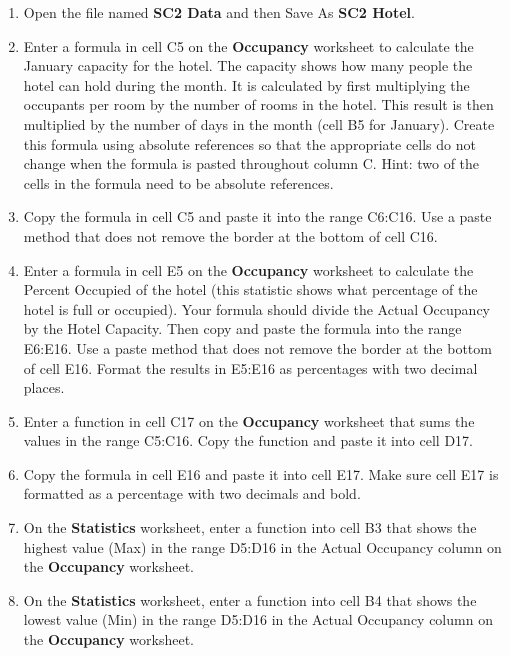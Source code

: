 \begin{enumerate}
	\item Open the file named \textbf{SC2 Data} and then Save As \textbf{SC2 Hotel}.
	
	\item Enter a formula in cell \textsf{C5} on the \textbf{Occupancy} worksheet to calculate the January capacity for the hotel. The capacity shows how many people the hotel can hold during the month. It is calculated by first multiplying the occupants per room by the number of rooms in the hotel. This result is then multiplied by the number of days in the month (cell \textsf{B5} for January). Create this formula using absolute references so that the appropriate cells do not change when the formula is pasted throughout column C. Hint: two of the cells in the formula need to be absolute references.
	
	\item Copy the formula in cell \textsf{C5} and paste it into the range \textsf{C6:C16}. Use a paste method that does not remove the border at the bottom of cell \textsf{C16}.
	
	\item Enter a formula in cell \textsf{E5} on the \textbf{Occupancy} worksheet to calculate the Percent Occupied of the hotel (this statistic shows what percentage of the hotel is full or occupied). Your formula should divide the Actual Occupancy by the Hotel Capacity. Then copy and paste the formula into the range \textsf{E6:E16}. Use a paste method that does not remove the border at the bottom of cell \textsf{E16}. Format the results in \textsf{E5:E16} as percentages with two decimal places.
	
	\item Enter a function in cell \textsf{C17} on the \textbf{Occupancy} worksheet that sums the values in the range \textsf{C5:C16}. Copy the function and paste it into cell \textsf{D17}.
	
	\item Copy the formula in cell \textsf{E16} and paste it into cell \textsf{E17}. Make sure cell \textsf{E17} is formatted as a percentage with two decimals and bold.
	
	\item On the \textbf{Statistics} worksheet, enter a function into cell \textsf{B3} that shows the highest value (Max) in the range \textsf{D5:D16} in the Actual Occupancy column on the \textbf{Occupancy} worksheet.
	
	\item On the \textbf{Statistics} worksheet, enter a function into cell \textsf{B4} that shows the lowest value (Min) in the range \textsf{D5:D16} in the Actual Occupancy column on the \textbf{Occupancy} worksheet.
	

\end{enumerate}
